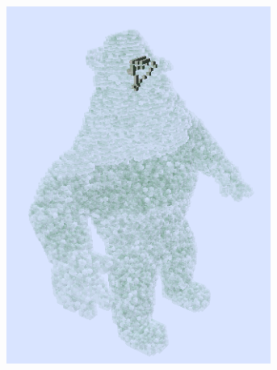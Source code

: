 \begin{figure}[!htb]
  \centering
  \begin{subfigure}{0.333\textwidth}
    \centering
    \includegraphics[width=0.95\textwidth]{Figures/chapter-image/dgtal/voxelComplexAlUltiP0.png}%
    \caption{}
    \label{subfig:thin_al_ulti}
  \end{subfigure}%
  \begin{subfigure}{0.333\textwidth}
    \centering

\end{subfigure}
\end{figure}
